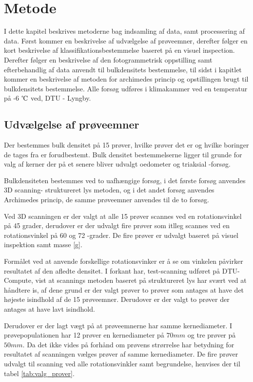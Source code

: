 \FloatBlock
\chapter{Metode}
I dette kapitel beskrives metoderne bag indsamling af data, samt processering af data. Først kommer en beskrivelse af udvælgelse af prøveemner, derefter følger en kort beskrivelse af klassifikationsbestemmelse baseret på en visuel inspection. Derefter følger en beskrivelse af den fotogrammetrisk oppstilling samt efterbehandlig af data anvendt til bulkdensitets bestemmelse, til sidst i kapitlet kommer en beskrivelse af metoden for archimedes princip og opstillingen brugt til bulkdensitets bestemmelse. Alle forsøg udføres i klimakammer ved en temperatur på -6 $\celsius$ ved, DTU - Lyngby. 
\section{Udvælgelse af prøveemner}
Der bestemmes bulk densitet på 15 prøver, hvilke prøver det er og hvilke boringer de tages fra er forudbestemt. Bulk densitet bestemmelserne ligger til grunde for valg af kerner der på et senere bliver udvalgt oedometer og triaksial -forsøg. 

\noindent Bulkdensiteten bestemmes ved to uafhængige forsøg, i det første forsøg anvendes 3D scanning- struktureret lys metoden, og i det andet forsøg anvendes Archimedes princip, de samme prøveemner anvendes til de to forsøg.

Ved 3D scanningen er der valgt at alle 15 prøver scannes ved en rotationsvinkel på 45 grader, derudover er der udvalgt fire prøver som itlleg scannes ved en rotationsvinkel på 60 og 72 -grader. De fire prøver er udvalgt baseret på visuel inspektion samt masse [g]. 

Formålet ved at anvende forskellige rotationsvinker er å se om vinkelen påvirker resultatet af den afledte densitet. 
I forkant har, test-scanning udføret på DTU-Compute, vist at scannings metoden baseret på struktureret lys har svært ved at håndtere is, af dene grund er der valgt prøver to prøver som antages at have det højeste isindhold af de 15 prøveemner. Derudover er der valgt to prøver der antages at have lavt isindhold.

Derudover er der lagt vægt på at prøveemnerne har samme kernediameter. I prøvepopulationen har 12 prøver en kernediameter på $70 mm$ og tre prøver på $50 mm$. Da det ikke vides på forhånd om prøvens strørrelse har betydning for resultatet af scanningen vælges prøver af samme kernediameter. De fire prøver udvalgt til scanning ved alle rotationsvinkler samt begrundelse, henvises der til tabel \vref{tab:valg_prover}.

